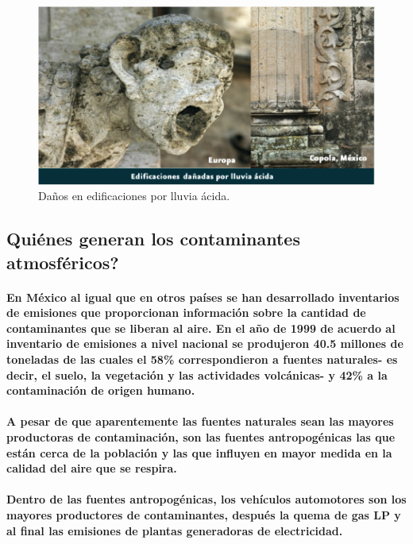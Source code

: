    \begin{figure}[h!]
      \centering
        \includegraphics[width=\textwidth]{./images/3.png}
      \caption{Daños en edificaciones por lluvia ácida.}
    \end{figure}

  \subsection {Quiénes generan los contaminantes atmosféricos?}
    \paragraph {En México al igual que  en otros países se han desarrollado inventarios de emisiones que proporcionan información sobre la cantidad de contaminantes que se liberan al aire. En el año de 1999 de acuerdo al inventario de emisiones a nivel nacional se produjeron 40.5 millones de toneladas de las cuales el 58\% correspondieron a fuentes naturales- es decir, el suelo, la vegetación y las actividades volcánicas-    y 42\% a la contaminación de origen humano.}

    \paragraph {A pesar de que aparentemente las fuentes naturales sean las mayores productoras de contaminación, son las fuentes antropogénicas las que están cerca de la población y las que influyen en mayor medida en la calidad del aire que se respira.}

    \paragraph {Dentro de las fuentes antropogénicas, los vehículos automotores son los mayores productores de contaminantes, después la quema de gas LP y al final las emisiones de plantas generadoras de  electricidad.}

